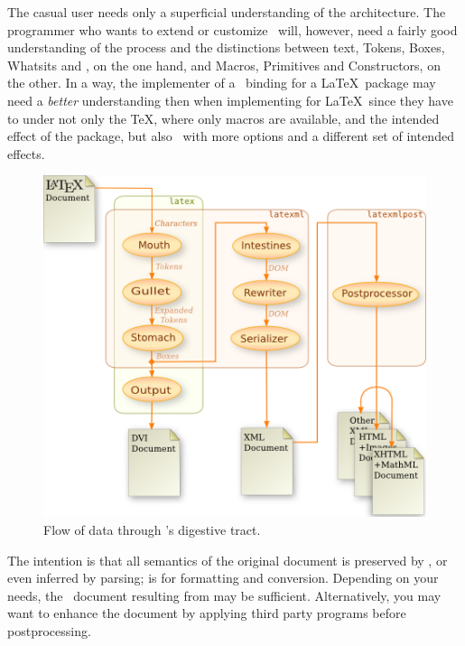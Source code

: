 \documentclass{book}
\begin{document}
The casual user needs only a superficial understanding of the architecture.
The programmer who wants to extend or customize \LaTeXML\ will, however,
need a fairly good understanding of the process and the distinctions between
text, Tokens, Boxes, Whatsits and \XML, on the one hand,
and Macros, Primitives and Constructors, on the other.
In a way, the implementer of a \LaTeXML\ binding for a \LaTeX\ package may
need a \emph{better} understanding then when implementing for \LaTeX\
since they have to under not only the \TeX, where only macros are available,
and the intended effect of the package, but also \LaTeXML\ with more options
and a different set of intended effects.

\begin{figure}[tb]
\begin{center}
\includegraphics[width=\textwidth]{figures/digestion}
\end{center}
\caption{Flow of data through \LaTeXML's digestive tract.\label{fig:dataflow}}
\end{figure}

The intention is that all semantics of the original document is
preserved by , or even inferred by parsing;
 is for formatting and conversion.
Depending on your needs, the \LaTeXML\ document resulting from  may be
sufficient. Alternatively, you may want to enhance the document
by applying third party programs before postprocessing.
\end{document}
